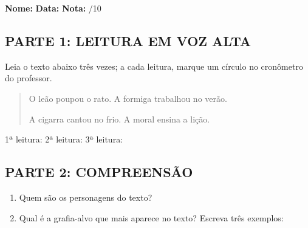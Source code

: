 \begin{exercicio}

\noindent\textbf{Nome:} \underline{\hspace{3.2cm}} \quad \textbf{Data:} \underline{\hspace{1.6cm}} \quad \textbf{Nota:} \underline{\hspace{0.9cm}}/10


\subsection*{PARTE 1: LEITURA EM VOZ ALTA}

Leia o texto abaixo três vezes; a cada leitura, marque um círculo no cronômetro do professor.

\begin{quote}
O leão poupou o rato. A formiga trabalhou no verão.

A cigarra cantou no frio. A moral ensina a lição.
\end{quote}

\begin{center}
1ª leitura: \underline{\hspace{1.5cm}} \quad 2ª leitura: \underline{\hspace{1.5cm}} \quad 3ª leitura: \underline{\hspace{1.5cm}}
\end{center}

\subsection*{PARTE 2: COMPREENSÃO}

\begin{enumerate}

  \item Quem são os personagens do texto?
  \begin{center}
  \underline{\hspace{12cm}}
  \end{center}

  \item Qual é a grafia-alvo que mais aparece no texto? Escreva três exemplos:
  \begin{center}
  \underline{\hspace{3.5cm}} \quad \underline{\hspace{3.5cm}} \quad \underline{\hspace{3.5cm}}
  \end{center}


\end{enumerate}
\end{exercicio}
